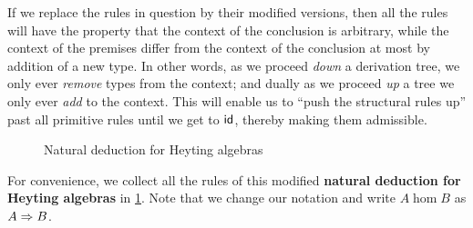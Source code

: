 If we replace the rules in question by their modified versions, then all the rules will have the property that the context of the conclusion is arbitrary, while the context of the premises differ from the context of the conclusion at most by addition of a new type.
In other words, as we proceed \emph{down} a derivation tree, we only ever \emph{remove} types from the context; and dually as we proceed \emph{up} a tree we only ever \emph{add} to the context.
This will enable us to ``push the structural rules up'' past all primitive rules until we get to $\mathsf{id}$, thereby making them admissible.

\begin{figure}
  \centering
  \caption{Natural deduction for Heyting algebras}
  \label{fig:natded-heyting}
\end{figure}

For convenience, we collect all the rules of this modified \textbf{natural deduction for Heyting algebras} in \cref{fig:natded-heyting}.
Note that we change our notation and write $A\hom B$ as $A\Rightarrow B$.

